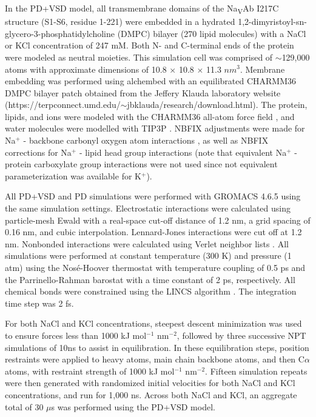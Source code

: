 \begin{refsection}
In the PD+VSD model, all transmembrane domains of the Na\textsubscript{V}Ab I217C structure (S1-S6, residue 1-221) were embedded in a hydrated 1,2-dimyristoyl-sn-glycero-3-phosphatidylcholine (DMPC) bilayer (270 lipid molecules) with a NaCl or KCl concentration of 247 mM. Both N- and C-terminal ends of the protein were modeled as neutral moieties. This simulation cell was comprised of $\sim$129,000 atoms with approximate dimensions of 10.8 $\times$ 10.8 $\times$ 11.3 $nm^3$. Membrane embedding was performed using alchembed \cite{Jefferys:2015jt} with an equilibrated CHARMM36 DMPC bilayer patch obtained from the Jeffery Klauda laboratory website (https://terpconnect.umd.edu/$\sim$jbklauda/research/download.html). The protein, lipids, and ions were modeled with the CHARMM36 all-atom force field \cite{Best:2012kb,Best:2012uu,MacKerell:1998tp,Klauda:2010tn}, and water molecules were modelled with TIP3P \cite{Jorgensen:1983ty}. NBFIX adjustments were made for Na$^+$ - backbone carbonyl oxygen atom interactions \cite{Noskov:2008jp}, as well as NBFIX corrections for Na$^+$ - lipid head group interactions \cite{Venable:2013ix} (note that equivalent Na$^+$ - protein carboxylate group interactions were not used since not equivalent parameterization was available for K$^+$). 

All PD+VSD and PD simulations were performed with GROMACS 4.6.5 \cite{Hess:2008db} using the same simulation settings. Electrostatic interactions were calculated using particle-mesh Ewald \cite{Essmann:1995vj,Darden:1993vu} with a real-space cut-off distance of 1.2 nm, a grid spacing of 0.16 nm, and cubic interpolation. Lennard-Jones interactions were cut off at 1.2 nm. Nonbonded interactions were calculated using Verlet neighbor lists \cite{Verlet:1967cm}. All simulations were performed at constant temperature (300 K) and pressure (1 atm) using the Nos\'e-Hoover thermostat \cite{Hoover:1985wf,Nose:1984em} with temperature coupling of 0.5 ps and the Parrinello-Rahman barostat \cite{Nose:1983cu,Parrinello:1980uc} with a time constant of 2 ps, respectively. All chemical bonds were constrained using the LINCS algorithm \cite{Hess:2008fl}. The integration time step was 2 fs. 

For both NaCl and KCl concentrations, steepest descent minimization was used to ensure forces less than 1000 kJ mol$^{-1}$ nm$^{-2}$, followed by three successive NPT simulations of 10ns to assist in equilibration. In these equilibration steps, position restraints were applied to heavy atoms, main chain backbone atoms, and then C$\alpha$ atoms, with restraint strength of 1000 kJ mol$^{-1}$ nm$^{-2}$. Fifteen simulation repeats were then generated with randomized initial velocities for both NaCl and KCl concentrations, and run for 1,000 ns. Across both NaCl and KCl, an aggregate total of 30 $\mu$s was performed using the PD+VSD model.


\end{refsection}
